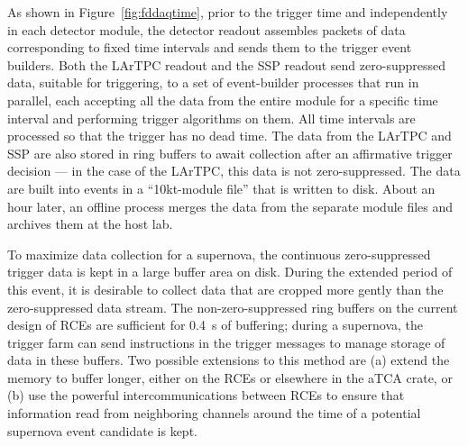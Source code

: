 As shown in Figure~\ref{fig:fddaqtime}, prior to the trigger time and
independently in each detector module, the detector readout assembles
packets of data corresponding to fixed time intervals and sends them
to the trigger event builders.  Both the LArTPC readout and the SSP
readout send zero-suppressed data, suitable for triggering, to a set
of event-builder processes that run in parallel, each accepting all
the data from the entire  module for a specific time interval and
performing trigger algorithms on them.  All time intervals are
processed so that the trigger has no dead time.  The data from the LArTPC and SSP
are also stored in ring buffers
  to await collection after an
affirmative trigger decision --- in the case of the LArTPC, this data
is not zero-suppressed.  The data are built into events in a ``10kt-module
file'' that is written to disk.  About an hour later, an offline process merges
the data from the separate  module files and archives them at the host lab.

To maximize data collection for a supernova, the continuous
zero-suppressed trigger data is kept in a large buffer area on disk.
During the extended period of this event, it is desirable to collect data that are cropped 
more gently than the zero-suppressed data stream. %
The non-zero-suppressed ring buffers on the current
design of RCEs are
sufficient for 0.4~s of buffering; during a supernova, the trigger farm can 
send
instructions in the trigger messages to manage storage of data in
these buffers.  Two possible extensions to this method
are (a) extend the memory to buffer longer, either on the RCEs or
elsewhere in the aTCA crate, or (b) use the powerful intercommunications between RCEs to ensure that  information read from neighboring channels around the time of a
potential supernova event candidate is kept.


